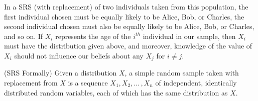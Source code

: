 \begin{center}
    \begin{minipage}{.45\textwidth}
       \centering
      \renewcommand*{\arraystretch}{1.35}
\renewcommand*{\arraystretch}{1}
\vspace{1em}
    \end{minipage}%
    \begin{minipage}{0.5\textwidth}
        \centering
{}
\end{minipage}
\end{center}

\par
In a SRS (with replacement) of two individuals taken from this population, the first individual chosen must be equally likely to be Alice, Bob, or Charles, the second individual chosen must also be equally likely to be Alice, Bob, or Charles, and so on. If $X_i$ represents the age of the $i^{th}$ individual in our sample, then $X_i$ must have the distribution given above, and moreover, knowledge of the value of $X_i$ should not influence our beliefs about any $X_j$ for $i \neq j$.
\par
\begin{defn}\label{FormalSRSDef} (SRS Formally) Given a distribution $X$, a simple random sample taken with replacement from $X$ is a sequence $X_1, X_2, \dots \,, X_n$ of independent, identically distributed random variables, each of which has the same distribution as $X$.
\end{defn}

